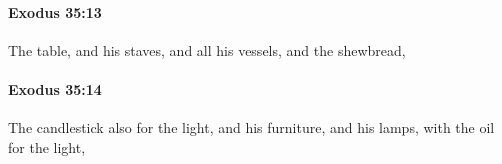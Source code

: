 		\paragraph{Exodus 35:13} %
			\label{EXODUS-35-13}

			The table, and his staves, and all his vessels, and the shewbread,


		\paragraph{Exodus 35:14} %
			\label{EXODUS-35-14}

			The candlestick also for the light, and his furniture, and his lamps, with the oil for the light,


